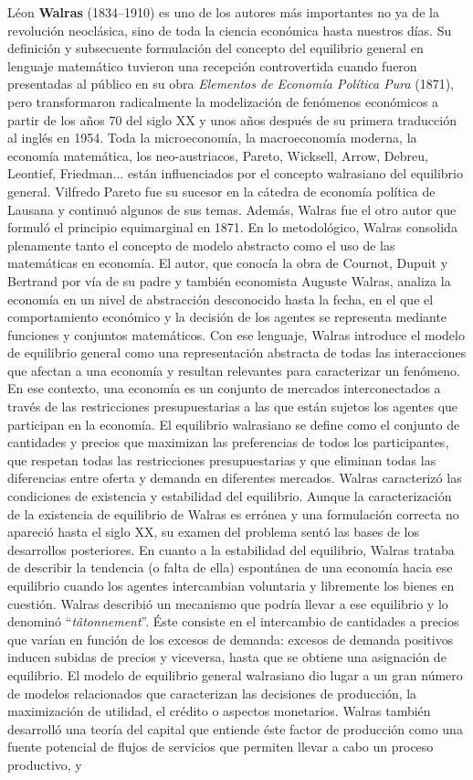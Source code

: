 \documentclass{nuevotema}
\begin{document}
Léon \textbf{Walras} (1834--1910) es uno de los autores más importantes no ya de la revolución neoclásica, sino de toda la ciencia económica hasta nuestros días. Su definición y subsecuente formulación del concepto del equilibrio general en lenguaje matemático tuvieron una recepción controvertida cuando fueron presentadas al público en su obra \textit{Elementos de Economía Política Pura} (1871), pero transformaron radicalmente la modelización de fenómenos económicos a partir de los años 70 del siglo XX y unos años después de su primera traducción al inglés en 1954. Toda la microeconomía, la macroeconomía moderna, la economía matemática, los neo-austriacos, Pareto, Wicksell, Arrow, Debreu, Leontief, Friedman... están influenciados por el concepto walrasiano del equilibrio general. Vilfredo Pareto fue su sucesor en la cátedra de economía política de Lausana y continuó algunos de sus temas. Además, Walras fue el otro autor que formuló el principio equimarginal en 1871. En lo metodológico, Walras consolida plenamente tanto el concepto de modelo abstracto como el uso de las matemáticas en economía. El autor, que conocía la obra de Cournot, Dupuit y Bertrand por vía de su padre y también economista Auguste Walras, analiza la economía en un nivel de abstracción desconocido hasta la fecha, en el que el comportamiento económico y la decisión de los agentes se representa mediante funciones y conjuntos matemáticos. Con ese lenguaje, Walras introduce el modelo de equilibrio general como una representación abstracta de todas las interacciones que afectan a una economía y resultan relevantes para caracterizar un fenómeno. En ese contexto, una economía es un conjunto de mercados interconectados a través de las restricciones presupuestarias a las que están sujetos los agentes que participan en la economía. El equilibrio walrasiano se define como el conjunto de cantidades y precios que maximizan las preferencias de todos los participantes, que respetan todas las restricciones presupuestarias y que eliminan todas las diferencias entre oferta y demanda en diferentes mercados. Walras caracterizó las condiciones de existencia y estabilidad del equilibrio. Aunque la caracterización de la existencia de equilibrio de Walras es errónea y una formulación correcta no apareció hasta el siglo XX, su examen del problema sentó las bases de los desarrollos posteriores. En cuanto a la estabilidad del equilibrio, Walras trataba de describir la tendencia (o falta de ella) espontánea de una economía hacia ese equilibrio cuando los agentes intercambian voluntaria y libremente los bienes en cuestión. Walras describió un mecanismo que podría llevar a ese equilibrio y lo denominó ``\textit{tâtonnement}''. Éste consiste en el intercambio de cantidades a precios que varían en función de los excesos de demanda: excesos de demanda positivos inducen subidas de precios y viceversa, hasta que se obtiene una asignación de equilibrio. El modelo de equilibrio general walrasiano dio lugar a un gran número de modelos relacionados que caracterizan las decisiones de producción, la maximización de utilidad, el crédito o aspectos monetarios. Walras también desarrolló una teoría del capital que entiende éste factor de producción como una fuente potencial de flujos de servicios que permiten llevar a cabo un proceso productivo, y 
\end{document}
